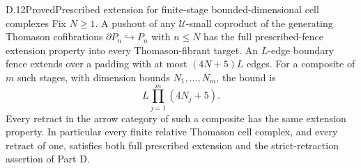 \begin{claim}{D.12}{Proved}{Prescribed extension for finite-stage bounded-dimensional cell complexes}
Fix $N\ge1$. A pushout of any $\mathcal U$-small coproduct of the generating Thomason cofibrations
$\partial P_n\hookrightarrow P_n$ with $n\le N$ has the full prescribed-fence extension property into every Thomason-fibrant target. An $L$-edge boundary fence extends over a padding with at most $(4N+5)L$ edges. For a composite of $m$ such stages, with dimension bounds $N_1,\ldots,N_m$, the bound is
\[
 L\prod_{j=1}^{m}(4N_j+5).
\]
Every retract in the arrow category of such a composite has the same extension property. In particular every finite relative Thomason cell complex, and every retract of one, satisfies both full prescribed extension and the strict-retraction assertion of Part D.
\end{claim}
